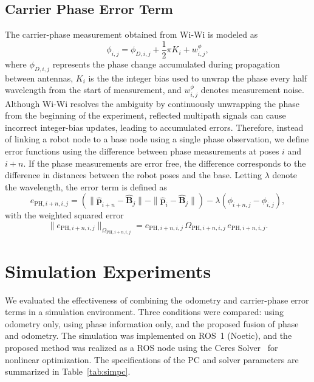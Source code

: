 \documentclass[conference]{IEEEtran}
\begin{document}
\subsection{Carrier Phase Error Term}
The carrier-phase measurement obtained from Wi-Wi is modeled as~\cite{Peng2017}
\begin{equation}
     \phi_{i,j} = \phi_{D,i,j} + \frac{1}{2}\pi K_i + w^{\phi}_{i,j},
\end{equation}
where $\phi_{D,i,j}$ represents the phase change accumulated during propagation between antennas, $K_i$ is the the integer bias used to unwrap the phase every half wavelength from the start of measurement, and $w^{\phi}_{i,j}$ denotes measurement noise.
Although Wi-Wi resolves the ambiguity by continuously unwrapping the phase from the beginning of the experiment, reflected multipath signals can cause incorrect integer-bias updates, leading to accumulated errors.
Therefore, instead of linking a robot node to a base node using a single phase observation, we define error functions using the difference between phase measurements at poses $i$ and $i+n$.
If the phase measurements are error free, the difference corresponds to the difference in distances between the robot poses and the base.
Letting $\lambda$ denote the wavelength, the error term is defined as
\begin{equation}
    e_{\mathrm{PH},i+n,i,j} = \left(\|\mathbf{\hat{p}}_{i+n} - \mathbf{\hat{B}}_j\| - \|\mathbf{\hat{p}}_{i} - \mathbf{\hat{B}}_j\|\right) - \lambda (\phi_{i+n,j} - \phi_{i,j}),
\end{equation}
with the weighted squared error
\begin{equation}
    \|e_{\mathrm{PH},i+n,i,j}\|_{\Omega_{\mathrm{PH},i+n,i,j}} = e_{\mathrm{PH},i+n,i,j} \, \Omega_{\mathrm{PH},i+n,i,j} \, e_{\mathrm{PH},i+n,i,j}.
\end{equation}

\section{Simulation Experiments}
We evaluated the effectiveness of combining the odometry and carrier-phase error terms in a simulation environment.
Three conditions were compared: using odometry only, using phase information only, and the proposed fusion of phase and odometry.
The simulation was implemented on ROS~1 (Noetic), and the proposed method was realized as a ROS node using the Ceres Solver~\cite{ceres-solver} for nonlinear optimization.
The specifications of the PC and solver parameters are summarized in Table~\ref{tab:simpc}.
\end{document}

